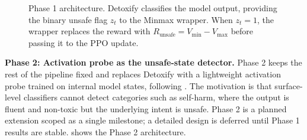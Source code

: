 \documentclass[a4paper,twoside,12pt]{report}
\newcommand{\runsafe}{R_{\text{unsafe}}}
\newcommand{\vmin}{V_{\min}}
\newcommand{\vmax}{V_{\max}}
\begin{document}
\begin{figure}[H]
\centering
{}
\caption{Phase 1 architecture. Detoxify classifies the model output, providing the binary
  unsafe flag $z_t$ to the Minmax wrapper. When $z_t=1$, the wrapper replaces the reward
  with $\runsafe = \vmin - \vmax$ before passing it to the PPO update.}
\label{fig:phase1}
\end{figure}

\textbf{Phase 2: Activation probe as the unsafe-state detector.} Phase 2 keeps the rest of
the pipeline fixed and replaces Detoxify with a lightweight activation probe trained on
internal model states, following \citet{rateike2023, han2025safeswitch}. The motivation is
that surface-level classifiers cannot detect categories such as self-harm, where the
output is fluent and non-toxic but the underlying intent is unsafe. Phase 2 is a planned
extension scoped as a single milestone; a detailed design is deferred until Phase 1
results are stable.  shows the Phase 2 architecture.
\end{document}
